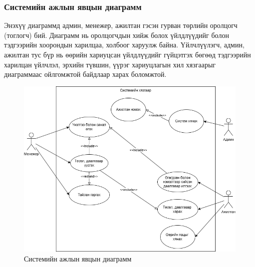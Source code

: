 \subsubsection{Системийн ажлын явцын диаграмм}
Энэхүү диаграммд админ, менежер, ажилтан гэсэн гурван төрлийн оролцогч
(тоглогч) бий. Диаграмм нь оролцогчдын хийж болох үйлдлүүдийг болон тэдгээрийн
хоорондын харилцаа, холбоог харуулж байна. Үйлчлүүлэгч, админ, ажилтан тус бүр нь
өөрийн хариуцсан үйлдлүүдийг гүйцэтгэх бөгөөд тэдгээрийн харилцан үйлчлэл, эрхийн
түвшин, үүрэг хариуцлагын хил хязгаарыг диаграммаас ойлгомжтой байдлаар харах
боломжтой.
\begin{figure}[h]
    \centering
    \includegraphics[scale=0.6]{src/images/diagram/usecase.png}
    \caption{Системийн ажлын явцын диаграмм}
    \label{fig:system_usecase_diagram}
\end{figure}


